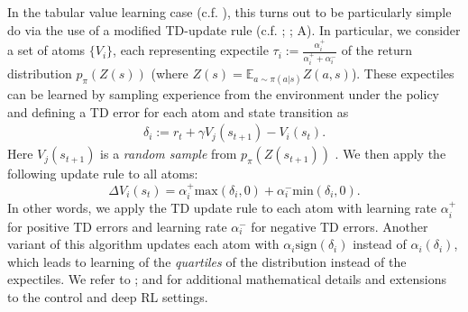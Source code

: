 In the tabular value learning case (c.f. ), this turns out to be particularly simple do via the use of a modified TD-update rule (c.f. ; \citealp{lowet2020distributional}; A).
In particular, we consider a set of atoms $\{ V_i \}$, each representing expectile $\tau_i := \frac{\alpha_i^+}{\alpha_i^+ + \alpha_i^-}$ of the return distribution $p_\pi(Z(s))$ (where $Z(s) = \mathbb{E}_{a \sim \pi(a|s)} Z(a, s)$).
These expectiles can be learned by sampling experience from the environment under the policy and defining a TD error for each atom and state transition as
\begin{align}
    \delta_i := r_t + \gamma V_j(s_{t+1}) - V_i(s_t).
\end{align}
Here $V_j(s_{t+1})$ is a \emph{random sample} from  $p_\pi(Z(s_{t+1}))$ \citep{lowet2020distributional,dabney2020distributional}.
We then apply the following update rule to all atoms:
\begin{equation}
    \label{eq:DRL_V_expec}
    \Delta V_i(s_t) = \alpha_i^+ \text{max}(\delta_i, 0 ) + \alpha_i^- \text{min}(\delta_i, 0).
\end{equation}
In other words, we apply the TD update rule to each atom with learning rate $\alpha_i^+$ for positive TD errors and learning rate $\alpha_i^-$ for negative TD errors.
Another variant of this algorithm updates each atom with $\alpha_i \text{sign}(\delta_i)$ instead of $\alpha_i (\delta_i)$, which leads to learning of the \emph{quartiles} of the distribution instead of the expectiles.
We refer to \citet{bellemare2017distributional,dabney2018distributional,rowland2019statistics,bellemare2023distributional}; and \citet{dabney2020distributional} for additional mathematical details and extensions to the control and deep RL settings.



